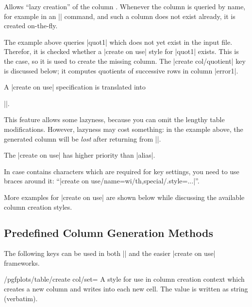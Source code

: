 \begin{pgfplotstablecreateonusekey}
	Allows ``lazy creation'' of the column . Whenever the column  is queried by name, for example in an |\pgfplotstabletypeset| command, and such a column does not exist already, it is created on-the-fly.

\begin{codeexample}[narrow]

\end{codeexample}
	The example above queries |quot1| which does not yet exist in the input file. Therefor, it is checked whether a |create on use| style for |quot1| exists. This is the case, so it is used to create the missing column. The |create col/quotient| key is discussed below; it computes quotients of successive rows in column |error1|.

	A |create on use| specification is translated into 
	
	||.

	This feature allows some lazyness, because you can omit the lengthy table modifications. However, lazyness may cost something: in the example above, the generated column will be \emph{lost} after returning from |\pgfplotstabletypesetfile|.

	The |create on use| has higher priority than |alias|.

	In case  contains characters which are required for key settings, you need to use braces around it: ``|create on use/{name=wi/th,special}/.style={...}|''.

	More examples for |create on use| are shown below while discussing the available column creation styles.
\end{pgfplotstablecreateonusekey}

\subsection{Predefined Column Generation Methods}
The following keys can be used in both |\pgfplotstablecreatecol| and the easier |create on use| frameworks.

\begin{stylekey}{/pgfplots/table/create col/set=}
	A style for use in column creation context which creates a new column and writes  into each new cell. The value is written as string (verbatim).
\begin{codeexample}[]

\end{codeexample}
\end{stylekey}

